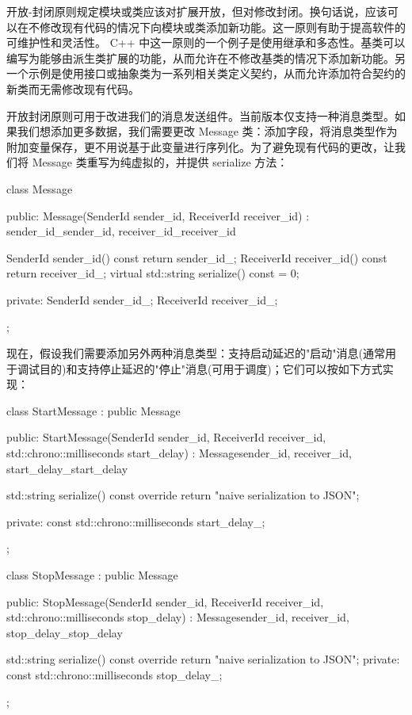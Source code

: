 开放-封闭原则规定模块或类应该对扩展开放，但对修改封闭。换句话说，应该可以在不修改现有代码的情况下向模块或类添加新功能。这一原则有助于提高软件的可维护性和灵活性。 C++ 中这一原则的一个例子是使用继承和多态性。基类可以编写为能够由派生类扩展的功能，从而允许在不修改基类的情况下添加新功能。另一个示例是使用接口或抽象类为一系列相关类定义契约，从而允许添加符合契约的新类而无需修改现有代码。

开放封闭原则可用于改进我们的消息发送组件。当前版本仅支持一种消息类型。如果我们想添加更多数据，我们需要更改 Message 类：添加字段，将消息类型作为附加变量保存，更不用说基于此变量进行序列化。为了避免现有代码的更改，让我们将 Message 类重写为纯虚拟的，并提供 serialize 方法：

\begin{cpp}
class Message {
public:
    Message(SenderId sender_id, ReceiverId receiver_id)
        : sender_id_{sender_id}, receiver_id_{receiver_id} {}

    SenderId sender_id() const { return sender_id_; }
    ReceiverId receiver_id() const { return receiver_id_; }
    virtual std::string serialize() const = 0;

private:
    SenderId sender_id_;
    ReceiverId receiver_id_;
};
\end{cpp}

现在，假设我们需要添加另外两种消息类型：支持启动延迟的"启动"消息(通常用于调试目的)和支持停止延迟的"停止"消息(可用于调度)；它们可以按如下方式实现：

\begin{cpp}
class StartMessage : public Message {
public:
    StartMessage(SenderId sender_id, ReceiverId receiver_id,
                 std::chrono::milliseconds start_delay)
        : Message{sender_id, receiver_id},
            start_delay_{start_delay} {}

    std::string serialize() const override {
        return {"naive serialization to JSON"};
    }

private:
    const std::chrono::milliseconds start_delay_;
};

class StopMessage : public Message {
public:
    StopMessage(SenderId sender_id, ReceiverId receiver_id,
                std::chrono::milliseconds stop_delay)
        : Message{sender_id, receiver_id},
        stop_delay_{stop_delay} {}

    std::string serialize() const override {
        return {"naive serialization to JSON"};
    }
private:
    const std::chrono::milliseconds stop_delay_;
};
\end{cpp}

